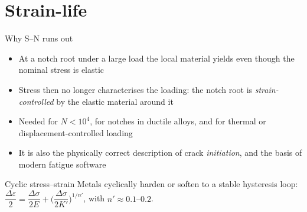 \documentclass[aspectratio=169,10pt]{beamer}
\begin{document}
\section{Strain-life}

\begin{frame}{Why S--N runs out}
\begin{itemize}
  \item At a notch root under a large load the local material \alert{yields} even though the nominal stress is elastic
  \item Stress then no longer characterises the loading: the notch root is \emph{strain-controlled} by the elastic material around it
  \item Needed for $N<10^{4}$, for notches in ductile alloys, and for thermal or displacement-controlled loading
  \item It is also the physically correct description of crack \emph{initiation}, and the basis of modern fatigue software
\end{itemize}
\begin{block}{Cyclic stress--strain}
Metals cyclically harden or soften to a stable hysteresis loop:
$\dfrac{\Delta\varepsilon}{2}=\dfrac{\Delta\sigma}{2E}+\Big(\dfrac{\Delta\sigma}{2K'}\Big)^{1/n'}$, with $n'\approx0.1$--$0.2$.
\end{block}
\end{frame}
\end{document}
